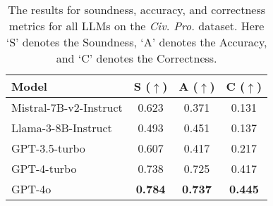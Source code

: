 \begin{table}[!htbp]
\centering
\begin{tabular}{lccc}
\toprule
Model   & S ($\uparrow$) & A ($\uparrow$)  & C ($\uparrow$)\\ 
\midrule
Mistral-7B-v2-Instruct   & 0.623  & 0.371 & 0.131\\ 
Llama-3-8B-Instruct   & 0.493  & 0.451 & 0.137\\ 
GPT-3.5-turbo   & 0.607  & 0.417 & 0.217\\ 
GPT-4-turbo     & 0.738  & 0.725 & 0.417\\ 
GPT-4o   & \textbf{0.784}  & \textbf{0.737} & \textbf{0.445}\\ 
\bottomrule
\end{tabular}
\caption{The results for soundness, accuracy, and correctness metrics for all LLMs on the \textit{Civ. Pro.} dataset. Here `S' denotes the Soundness, `A' denotes the Accuracy, and `C' denotes the Correctness.}
\label{table:metrics}
\end{table}